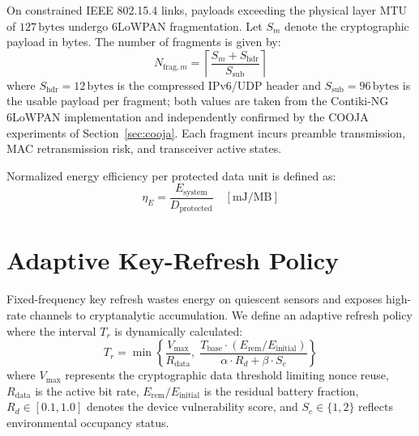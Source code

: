\documentclass[journal]{IEEEtran}
\begin{document}
On constrained IEEE 802.15.4 links, payloads exceeding the physical layer MTU of
$127\,\text{bytes}$ undergo 6LoWPAN fragmentation. Let $S_m$ denote the cryptographic payload
in bytes. The number of fragments is given by:
\begin{equation}
N_{\mathrm{frag},m} = \left\lceil \frac{S_m + S_{\mathrm{hdr}}}{S_{\mathrm{sub}}} \right\rceil
\end{equation}
where $S_{\mathrm{hdr}} = 12\,\text{bytes}$ is the compressed IPv6/UDP header and
$S_{\mathrm{sub}} = 96\,\text{bytes}$ is the usable payload per fragment; both values are
taken from the Contiki-NG 6LoWPAN implementation and independently confirmed by the COOJA
experiments of Section~\ref{sec:cooja}. Each fragment
incurs preamble transmission, MAC retransmission risk, and transceiver active states.

Normalized energy efficiency per protected data unit is defined as:
\begin{equation}
\eta_E = \frac{E_{\mathrm{system}}}{D_{\mathrm{protected}}} \quad [\text{mJ/MB}]
\end{equation}


\section{Adaptive Key-Refresh Policy}

Fixed-frequency key refresh wastes energy on quiescent sensors and exposes high-rate
channels to cryptanalytic accumulation. We define an adaptive refresh policy where
the interval $T_r$ is dynamically calculated:
\begin{equation}
T_r = \min \left\{ \frac{V_{\mathrm{max}}}{R_{\mathrm{data}}}, \; \frac{T_{\mathrm{base}} \cdot (E_{\mathrm{rem}} / E_{\mathrm{initial}})}{\alpha \cdot R_d + \beta \cdot S_c} \right\}
\label{eq:refresh}
\end{equation}
where $V_{\mathrm{max}}$ represents the cryptographic data threshold limiting nonce
reuse, $R_{\mathrm{data}}$ is the active bit rate, $E_{\mathrm{rem}}/E_{\mathrm{initial}}$
is the residual battery fraction, $R_d \in [0.1, 1.0]$ denotes the device vulnerability
score, and $S_c \in \{1, 2\}$ reflects environmental occupancy status.

\end{document}
